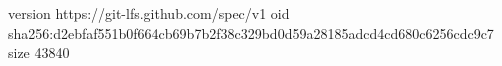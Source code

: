 version https://git-lfs.github.com/spec/v1
oid sha256:d2ebfaf551b0f664cb69b7b2f38c329bd0d59a28185adcd4cd680c6256cdc9c7
size 43840
